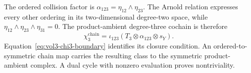 \begin{remark}
\label{rem:hoch-chi-3-chain-level}
The ordered collision factor is
$\alpha_{123}=\eta_{12}\wedge\eta_{23}$.  The Arnold relation
expresses every other ordering in its two-dimensional degree-two
space, while
$\eta_{12}\wedge\eta_{23}\wedge\eta_{31}=0$.  The product-ambient
degree-three cochain is therefore
\begin{equation}
\label{eq:hoch-chi-3-chain-level}
 \chi_3^{\mathrm{chain}}
 =\iota_{123}(T_3\otimes\alpha_{123}\otimes s_Y).
\end{equation}
Equation~\eqref{eq:vol3-chi3-boundary} identifies its closure
condition.  An
ordered-to-symmetric chain map carries the resulting class to the
symmetric product-ambient complex.  A dual cycle with nonzero
evaluation proves nontriviality.
\end{remark}

